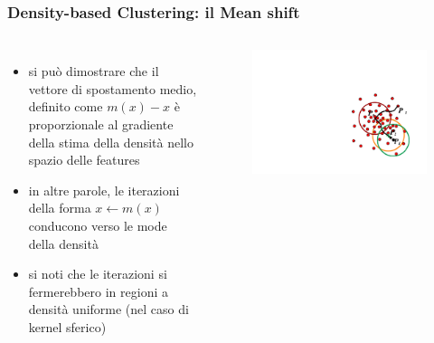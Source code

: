 \begin{frame}

	\frametitle{{\color{GradientDescentDiagramRed}Density-based Clustering}: il Mean shift}


		\begin{columns}

			\begin{itemize}
				\item si può dimostrare che il vettore di spostamento medio, definito come $m(x)-x$ è proporzionale al gradiente della stima della densità nello spazio delle features
				\item in altre parole, le iterazioni della forma $x \leftarrow m(x)$ conducono verso le mode della densità
				\item si noti che le iterazioni si fermerebbero in regioni a densità uniforme (nel caso di kernel sferico)
			\end{itemize}
			\begin{figure}[!htbp]
				\centering
				\includegraphics[width=1.0\linewidth]{images/unsupervised/non_parametric/mean_shift_idea.pdf}
			\end{figure}


		\end{columns}


\end{frame}


